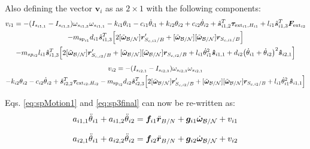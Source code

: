 \documentclass[paper]{aiaaNew}
\begin{document}
Also defining the vector $\bm v_i$ as  as $2\times1$ with the following components:
	\begin{multline}
v_{i1} = - (I_{s_{i1,1}} - I_{s_{i1,3}}) \omega_{s_{i1,3}} \omega_{s_{i1,1}} - k_{i1} \theta_{i1} - c_{i1}\dot{\theta}_{i1} 
+  k_{i2} \theta_{i2} + c_{i2} \dot\theta_{i2} 
+ \hat{\bm s}_{i1,2}^T \bm \tau_{\text{ext}_{i1},H_{i1}} + l_{i1} \hat{\bm s}_{i1,3}^T \bm F_{\text{ext}_{i2}}\\ 
- m_{\text{sp}_{i1}} d_{i1} \hat{\bm s}_{i1,3}^T \Big[2 [\tilde{\bm\omega}_{\cal B/N}] \bm{r}'_{S_{c,i1}/B}
+ [\tilde{\bm\omega}_{\cal B/N}] [\tilde{\bm\omega}_{\cal B/N}] \bm{r}_{S_{c,i1}/B}\Big]
\\
- m_{sp_{i2}} l_{i1} \hat{\bm s}_{i1,3}^T \Big[ 2 [\tilde{\bm\omega}_{\cal B/N}] \bm{r}'_{S_{c,i2}/B} 
+ [\tilde{\bm\omega}_{\cal B/N}] [\tilde{\bm\omega}_{\cal B/N}] \bm{r}_{S_{c,i2}/B} + l_{i1} \dot{\theta}_{i1}^2 \bm{\hat{s}}_{i1,1} + d_{i2}\big(\dot{\theta}_{i1} + \dot{\theta}_{i2}\big)^2\bm{\hat{s}}_{i2,1}\Big]
\label{eq:solar_panel_final8}
\end{multline}
\begin{multline}
v_{i2} = - (I_{s_{i2,1}} - I_{s_{i2,3}}) \omega_{s_{i2,3}} \omega_{s_{i2,1}} \\
- k_{i2} \theta_{i2} - c_{i2} \dot{\theta}_{i2} + \hat{\bm s}_{i2,2}^T \bm \tau_{\text{ext}_{i2},H_{i2}}  
-  m_{\text{sp}_{i2}} d_{i2} \hat{\bm s}_{i2,3}^T \Big[ 2 [\tilde{\bm\omega}_{\cal B/N}] \bm{r}'_{S_{c,i2}/B} + [\tilde{\bm\omega}_{\cal B/N}] [\tilde{\bm\omega}_{\cal B/N}] \bm{r}_{S_{c,i2}/B} + l_{i1} \dot{\theta}_{i1}^2 \bm{\hat{s}}_{i1,1} \Big]
\end{multline}

Eqs. \eqref{eq:spMotion1} and \eqref{eq:sp3final} can now be re-written as:
\begin{equation}
a_{i1,1} \ddot\theta_{i1} +  a_{i1,2} \ddot{\theta}_{i2}=\bm f_{i1} \ddot{\bm{r}}_{B/N} + \bm g_{i1}\dot{\bm\omega}_{\cal B/N} 
+v_{i1}
\label{eq:spMotion1Simple}
\end{equation}

\begin{equation}
a_{i2,1} \ddot\theta_{i1} 
+ a_{i2,2}\ddot\theta_{i2} = \bm f_{i2}\ddot{\bm{r}}_{B/N} + \bm g_{i2}\dot{\bm\omega}_{\cal B/N} + v_{i2}
\label{eq:sp3finalSimple}
\end{equation}
\end{document}
